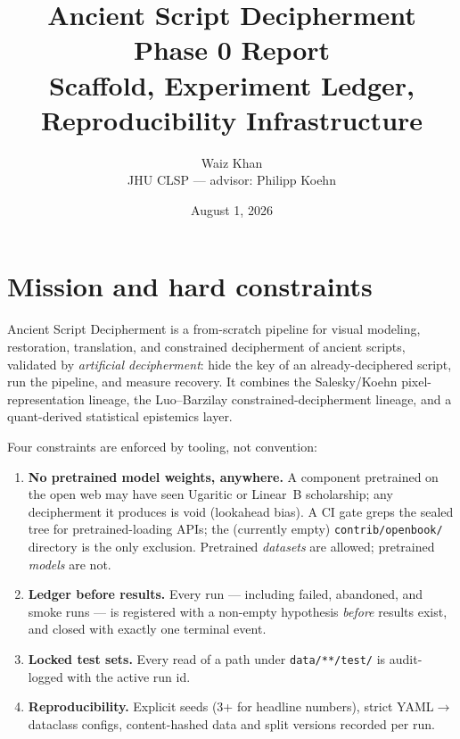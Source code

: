 \documentclass[11pt]{article}
\title{\Large Ancient Script Decipherment\\
\large Phase 0 Report\\
\normalsize Scaffold, Experiment Ledger, Reproducibility Infrastructure}
\author{Waiz Khan\\ \small JHU CLSP --- advisor: Philipp Koehn}
\date{August 1, 2026 \quad {\small stamp: \ReportStamp}}
\begin{document}
\maketitle

\section{Mission and hard constraints}
Ancient Script Decipherment is a from-scratch pipeline for visual modeling, restoration,
translation, and constrained decipherment of ancient scripts, validated by
\emph{artificial decipherment}: hide the key of an already-deciphered script,
run the pipeline, and measure recovery. It combines the Salesky/Koehn pixel-
representation lineage, the Luo--Barzilay constrained-decipherment lineage,
and a quant-derived statistical epistemics layer.

Four constraints are enforced by tooling, not convention:
\begin{enumerate}
  \item \textbf{No pretrained model weights, anywhere.} A component pretrained
        on the open web may have seen Ugaritic or Linear~B scholarship;
        any decipherment it produces is void (lookahead bias). A CI gate
        greps the sealed tree for pretrained-loading APIs; the (currently
        empty) \texttt{contrib/openbook/} directory is the only exclusion.
        Pretrained \emph{datasets} are allowed; pretrained \emph{models} are not.
  \item \textbf{Ledger before results.} Every run --- including failed,
        abandoned, and smoke runs --- is registered with a non-empty
        hypothesis \emph{before} results exist, and closed with exactly one
        terminal event.
  \item \textbf{Locked test sets.} Every read of a path under
        \texttt{data/**/test/} is audit-logged with the active run id.
  \item \textbf{Reproducibility.} Explicit seeds (3+ for headline numbers),
        strict YAML$\to$dataclass configs, content-hashed data and split
        versions recorded per run.
\end{enumerate}
\end{document}
